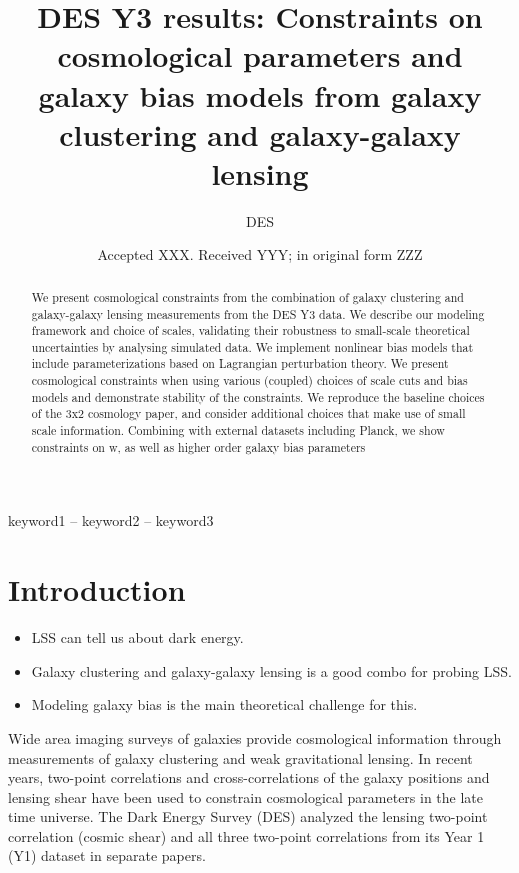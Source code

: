 \documentclass[fleqn,usenatbib]{mnras}
\title[Short title, max. 45 characters]{DES Y3 results: Constraints on cosmological parameters and galaxy bias models from galaxy clustering and galaxy-galaxy lensing}
\author[DES et al.]{
DES
}
\date{Accepted XXX. Received YYY; in original form ZZZ}
\begin{document}
\label{firstpage}
\pagerange{\pageref{firstpage}--\pageref{lastpage}}
\maketitle

\begin{abstract}
We present cosmological constraints from the combination of galaxy clustering and galaxy-galaxy lensing measurements from the DES Y3 data. We describe our modeling framework and choice of scales, validating their robustness to small-scale theoretical uncertainties by analysing simulated data. We implement nonlinear bias models that include parameterizations based on Lagrangian perturbation theory. We present cosmological constraints when using various (coupled) choices of scale cuts and bias models and demonstrate stability of the constraints. We reproduce the baseline choices of the 3x2 cosmology paper, and consider additional choices that make use of small scale information.  Combining with external datasets including Planck, we show constraints on w, as well as higher order galaxy bias parameters
\end{abstract}

\begin{keywords}
keyword1 -- keyword2 -- keyword3
\end{keywords}



\section{Introduction}
\label{sec:intro}
\begin{itemize}
    \item LSS can tell us about dark energy.
    \item Galaxy clustering and galaxy-galaxy lensing is a good combo for probing LSS.
    \item Modeling galaxy bias is the main theoretical challenge for this.
\end{itemize}

Wide area imaging surveys of galaxies provide cosmological information through measurements of galaxy clustering and weak gravitational lensing. In recent years, two-point correlations and cross-correlations of the galaxy positions and lensing shear have been used to constrain cosmological parameters in the late time universe. The Dark Energy Survey (DES) analyzed the lensing two-point correlation (cosmic shear) and all three two-point correlations from its Year 1 (Y1) dataset in separate papers. 
\end{document}
